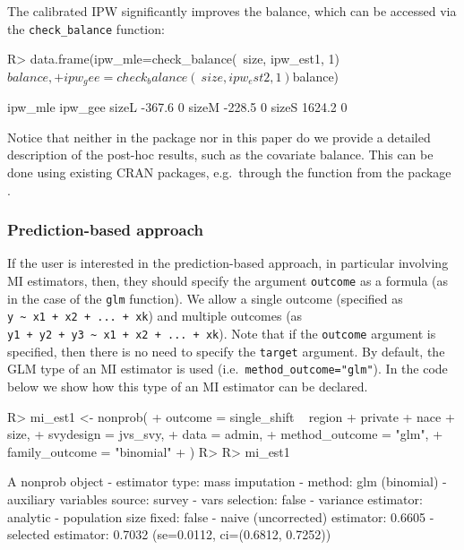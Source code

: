 \documentclass[
]{jss}
\begin{document}
The calibrated IPW significantly improves the balance, which can be
accessed via the \texttt{check\_balance} function:

\begin{CodeChunk}
\begin{CodeInput}
R> data.frame(ipw_mle=check_balance(~size, ipw_est1, 1)$balance,
+            ipw_gee=check_balance(~size, ipw_est2, 1)$balance)
\end{CodeInput}
\begin{CodeOutput}
      ipw_mle ipw_gee
sizeL  -367.6       0
sizeM  -228.5       0
sizeS  1624.2       0
\end{CodeOutput}
\end{CodeChunk}

Notice that neither in the package nor in this paper do we provide a
detailed description of the post-hoc results, such as the covariate
balance. This can be done using existing CRAN packages, e.g.~through the
 function from the  package \citep{cobalt}.

\subsubsection{Prediction-based
approach}\label{prediction-based-approach}

If the user is interested in the prediction-based approach, in
particular involving MI estimators, then, they should specify the
argument \texttt{outcome} as a formula (as in the case of the
\texttt{glm} function). We allow a single outcome (specified as
\texttt{y\ \textasciitilde{}\ x1\ +\ x2\ +\ ...\ +\ xk}) and multiple
outcomes (as
\texttt{y1\ +\ y2\ +\ y3\ \textasciitilde{}\ x1\ +\ x2\ +\ ...\ +\ xk}).
Note that if the \texttt{outcome} argument is specified, then there is
no need to specify the \texttt{target} argument. By default, the GLM
type of an MI estimator is used (i.e.~\texttt{method\_outcome="glm"}).
In the code below we show how this type of an MI estimator can be
declared.

\begin{CodeChunk}
\begin{CodeInput}
R> mi_est1 <- nonprob(
+   outcome = single_shift ~ region + private + nace + size,
+   svydesign = jvs_svy,
+   data = admin,
+   method_outcome = "glm",
+   family_outcome = "binomial"
+ )
R> 
R> mi_est1
\end{CodeInput}
\begin{CodeOutput}
A nonprob object
 - estimator type: mass imputation
 - method: glm (binomial)
 - auxiliary variables source: survey
 - vars selection: false
 - variance estimator: analytic
 - population size fixed: false
 - naive (uncorrected) estimator: 0.6605
 - selected estimator: 0.7032 (se=0.0112, ci=(0.6812, 0.7252))
\end{CodeOutput}
\end{CodeChunk}
\end{document}
